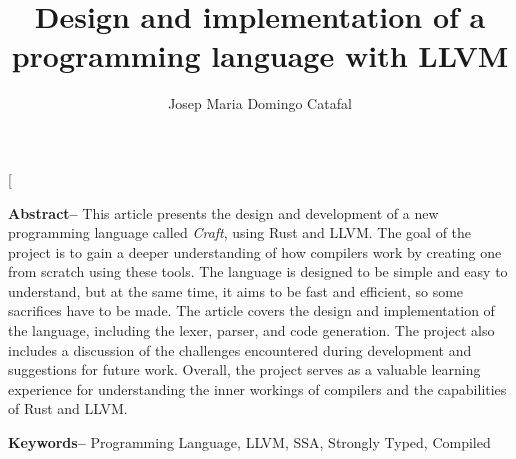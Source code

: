 ﻿\documentclass[10pt,a4paper,twocolumn,twoside]{article}
\author{\LARGE\sffamily Josep Maria Domingo Catafal}
\title{\Huge{\sffamily  Design and implementation of a programming language with LLVM }}
\date{}
\begin{document}
\fancyhead[RO]{\thepage}
\fancyhead[LE]{\thepage}

\fancyfoot[CO,CE]{}

{
   \fancyhf{}
}

\renewcommand{\headrulewidth}{0pt}
\renewcommand{\footrulewidth}{0pt}
\pagestyle{fancy}

\twocolumn[\begin{@twocolumnfalse}

\maketitle

\thispagestyle{primerapagina}

\begin{center}
\parbox{0.915\textwidth}
{\sffamily

    \textbf{Abstract--} This article presents the design and development of a new
    programming language called \textit{Craft}, using Rust and LLVM. The goal of
    the project is to gain a deeper understanding of how compilers work by
    creating one from scratch using these tools. The language is designed to be
    simple and easy to understand, but at the same time, it aims to be fast and
    efficient, so some sacrifices have to be made. The article covers the design
    and implementation of the language, including the lexer, parser, and code
    generation. The project also includes a discussion of the challenges
    encountered during development and suggestions for future work. Overall, the
    project serves as a valuable learning experience for understanding the inner
    workings of compilers and the capabilities of Rust and LLVM.

    \bigskip

    \textbf{Keywords-- } Programming Language, LLVM, SSA, Strongly Typed, Compiled

    \bigskip

}
\end{center}
\end{@twocolumnfalse}
\end{document}
